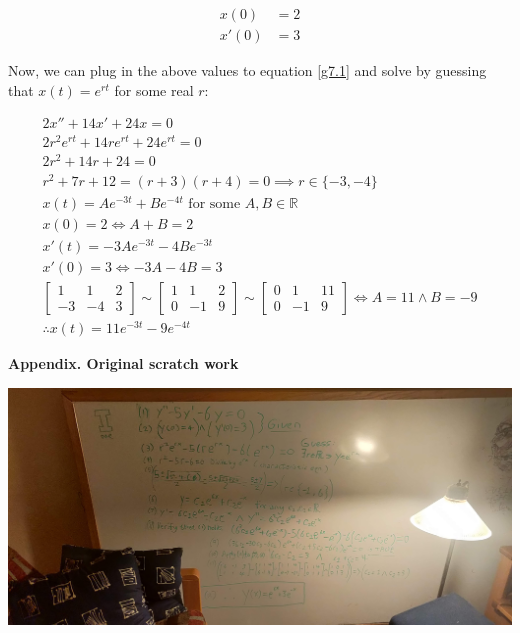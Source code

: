 \documentclass[12pt]{article}
\newcommand{\reals}{\mathbb{R}}
\begin{document}
\begin{align}
	x(0) & = 2 \\
	x'(0) & = 3
\end{align}

Now, we can plug in the above values to equation \ref{g7.1} and solve
by guessing that $x(t) = e^{rt}$ for some real $r$:

\begin{align}
	2x'' + 14x' + 24x = 0 \\
	2r^2e^{rt} + 14re^{rt} + 24e^{rt} = 0 \\
	2r^2+ 14r+ 24 = 0 \\
	r^2+ 7r+ 12 = (r+3)(r+4) = 0 \implies r \in \{ -3, -4 \} \\
	x(t) = Ae^{-3t}+Be^{-4t} \textrm{ for some } A,B \in \reals \\
	x(0) = 2 \iff A+B = 2 \\
	x'(t) = -3Ae^{-3t}-4Be^{-3t} \\
	x'(0) = 3 \iff -3A-4B = 3 \\
	\begin{bmatrix} 1 & 1 & 2 \\ -3 & -4 & 3 \end{bmatrix} \sim
	\begin{bmatrix} 1 & 1 & 2 \\ 0 & -1 & 9 \end{bmatrix} \sim
	\begin{bmatrix} 0 & 1 & 11 \\ 0 & -1 & 9 \end{bmatrix} \iff
	A = 11 \land B = -9 \\
	\therefore x(t) = 11e^{-3t}-9e^{-4t}
\end{align}


\pagebreak

\textbf{Appendix. Original scratch work}

\medskip

\includegraphics[scale=0.075]{1.jpg}
\end{document}
